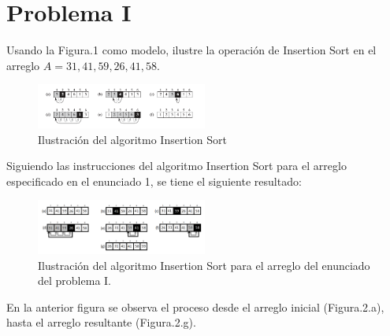 \section{Problema I}
Usando la Figura.1 como modelo, ilustre la operación de Insertion Sort en el arreglo $A = {31, 41, 59, 26, 41, 58}$.
    
    \begin{figure}[H]
    \centering
    \includegraphics[width=0.5\textwidth]{img/fig1}
    \caption{Ilustración del algoritmo Insertion Sort}
    \label{fig1}
    \end{figure}

Siguiendo las instrucciones del algoritmo Insertion Sort para el arreglo especificado en el enunciado 1, se tiene el siguiente resultado:

    \begin{figure}[H]
    \centering
    \includegraphics[width=0.5\textwidth]{img/fig2}
    \caption{Ilustración del algoritmo Insertion Sort para el arreglo del enunciado del problema I.}
    \label{fig2}
    \end{figure}
    
En la anterior figura se observa el proceso desde el arreglo inicial (Figura.2.a), hasta el arreglo resultante (Figura.2.g).
